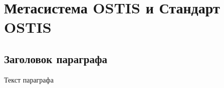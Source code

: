 
\chapter{Метасистема OSTIS и Стандарт OSTIS}
\label{chapter_ims_standard}


\section{Заголовок параграфа}
Текст параграфа

%